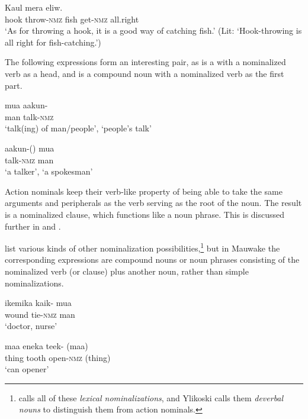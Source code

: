 \ea%
\label{ex:3:x67}
\gll Kaul   mera  eliw. \\
hook throw-\textsc{nmz} fish get-\textsc{nmz} all.right\\
\glt`As for throwing a hook, it is a good way of catching fish.' (Lit: `Hook-throwing is all right for fish-catching.') 
\z 

The following expressions form an interesting pair, as  is a  with a nominalized verb as a head, and  is a compound noun with a nominalized verb as the first part.

\ea%
\label{ex:3:x424}
\gll mua aakun- \\
man talk-\textsc{nmz}\\
\glt`talk(ing) of man/people', `people's talk'
\z

\ea%
\label{ex:3:x425}
\gll aakun-() mua \\
talk-\textsc{nmz} man\\
\glt`a talker', `a spokesman'
\z

Action nominals keep their verb-like property of being able to take the same arguments and peripherals as the verb serving as the root of the noun. The result is a nominalized clause, which functions like a noun phrase. This is discussed further in  and .

\citet[334--342]{ComrieEtAl2007} list various kinds of other nominalization possibilities,\footnote{\citet[500]{Givon1990} calls all of these \textit{lexical nominalizations}, and Ylikoski calls them \textit{deverbal nouns} \citeyear[193]{Ylikoski2003} to distinguish them from action nominals.} but in Mauwake the corresponding expressions are compound nouns or noun phrases consisting of the nominalized verb (or clause) plus another noun, rather than simple nominalizations. 

\ea%
\label{ex:3:x1232}
\gll ikemika kaik- mua \\
wound tie-\textsc{nmz} man\\
\glt`doctor, nurse'
\z

\ea%
\label{ex:3:x1233}
\gll maa eneka teek- (maa)\footnotemark{} \\
thing tooth open-\textsc{nmz} (thing)\\
\glt`can opener'
\z

